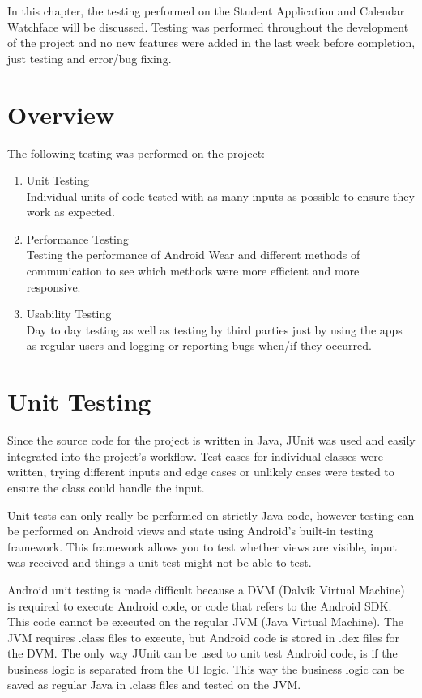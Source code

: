 In this chapter, the testing performed on the Student Application and Calendar
Watchface will be discussed. Testing was performed throughout the development
of the project and no new features were added in the last week before
completion, just testing and error/bug fixing.

\section{Overview}

The following testing was performed on the project:
\begin{enumerate}
\item Unit Testing\\
    Individual units of code tested with as many inputs as possible to ensure
    they work as expected.
\item Performance Testing\\
    Testing the performance of Android Wear and different methods of
    communication to see which methods were more efficient and more responsive.
\item Usability Testing\\
    Day to day testing as well as testing by third parties just by using the
    apps as regular users and logging or reporting bugs when/if they occurred.
\end{enumerate}

\section{Unit Testing}

Since the source code for the project is written in Java, JUnit was used and
easily integrated into the project's workflow. Test cases for individual classes
were written, trying different inputs and edge cases or unlikely cases were
tested to ensure the class could handle the input.

Unit tests can only really be performed on strictly Java code, however testing
can be performed on Android views and state using Android's built-in testing
framework. This framework allows you to test whether views are visible, input
was received and things a unit test might not be able to test.

Android unit testing is made difficult because a DVM (Dalvik Virtual Machine) is
required to execute Android code, or code that refers to the Android SDK. This
code cannot be executed on the regular JVM (Java Virtual Machine). The JVM
requires .class files to execute, but Android code is stored in .dex files for
the DVM. The only way JUnit can be used to unit test Android code, is if the
business logic is separated from the UI logic. This way the business logic can
be saved as regular Java in .class files and tested on the JVM.

